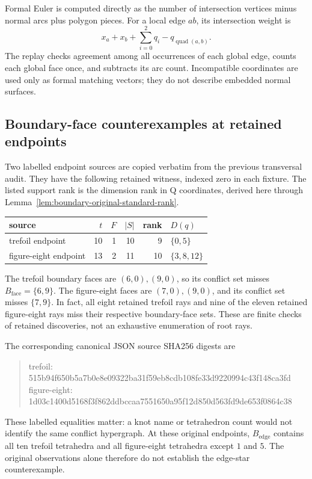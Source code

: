 Formal Euler is computed directly as the number of intersection vertices
minus normal arcs plus polygon pieces.  For a local edge $ab$, its
intersection weight is
\[
 x_a+x_b+\sum_{i=0}^2q_i-q_{\operatorname{quad}(a,b)}.
\]
The replay checks agreement among all occurrences of each global edge,
counts each global face once, and subtracts its arc count.  Incompatible
coordinates are used only as formal matching vectors; they do not
describe embedded normal surfaces.

\subsection{Boundary-face counterexamples at retained endpoints}

Two labelled endpoint sources are copied verbatim from the previous
transversal audit.  They have the following retained witness, indexed
zero in each fixture.  The listed support rank is the dimension rank in
Q coordinates, derived here through Lemma~\ref{lem:boundary-original-standard-rank}.
\begin{center}
\begin{tabular}{lrrrrl}
source & $t$ & $F$ & $|S|$ & rank & $D(q)$ \\
\hline
trefoil endpoint & 10 & 1 & 10 & 9 & $\{0,5\}$ \\
figure-eight endpoint & 13 & 2 & 11 & 10 & $\{3,8,12\}$
\end{tabular}
\end{center}
The trefoil boundary faces are $(6,0),(9,0)$, so its conflict set misses
$B_{\mathrm{face}}=\{6,9\}$.  The figure-eight faces are $(7,0),(9,0)$,
and its conflict set misses $\{7,9\}$.  In fact, all eight retained
trefoil rays and nine of the eleven retained figure-eight rays miss
their respective boundary-face sets.  These are finite checks of
retained discoveries, not an exhaustive enumeration of root rays.

The corresponding canonical JSON source SHA256 digests are
\begin{quote}\small\ttfamily
trefoil:\newline
515b94f650b5a7b0e8e09322ba31f59eb8cdb108fe33d9220994c43f148ca3fd\newline
figure-eight:\newline
1d03c1400d5168f3f862ddbccaa7551650a95f12d850d563fd9de653f0864c38
\end{quote}
These labelled equalities matter: a knot name or tetrahedron count would
not identify the same conflict hypergraph.  At these original endpoints,
$B_{\mathrm{edge}}$ contains all ten trefoil tetrahedra and all
figure-eight tetrahedra except $1$ and $5$.  The original observations
alone therefore do not establish the edge-star counterexample.

